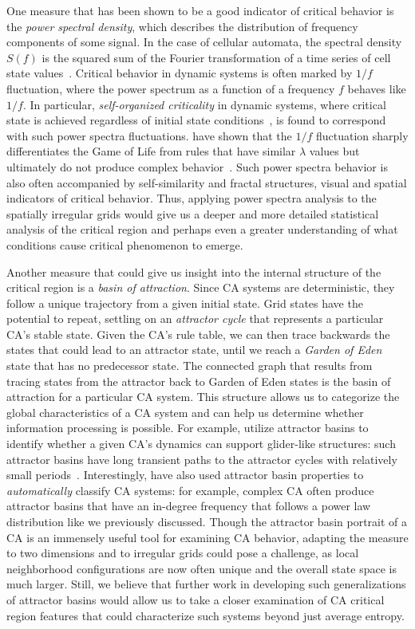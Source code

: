 \documentclass[a4paper,11pt,twoside]{report}
\begin{document}
One measure that has been shown to be a good indicator of critical behavior is the \textit{power spectral density}, which describes the distribution of frequency components of some signal. In the case of cellular automata, the spectral density $S(f)$ is the squared sum of the Fourier transformation of a time series of cell state values~\cite{ni98}. Critical behavior in dynamic systems is often marked by $1/f$ fluctuation, where the power spectrum as a function of a frequency $f$ behaves like $1/f$. In particular, \textit{self-organized criticality} in dynamic systems, where critical state is achieved regardless of initial state conditions~\cite{ba88}, is found to correspond with such power spectra fluctuations. \citeauthor{ni98} have shown that the $1/f$ fluctuation sharply differentiates the Game of Life from rules that have similar $\lambda$ values but ultimately do not produce complex behavior~\cite{ni98}. Such power spectra behavior is also often accompanied by self-similarity and fractal structures, visual and spatial indicators of critical behavior. Thus, applying power spectra analysis to the spatially irregular grids would give us a deeper and more detailed statistical analysis of the critical region and perhaps even a greater understanding of what conditions cause critical phenomenon to emerge.

Another measure that could give us insight into the internal structure of the critical region is a \textit{basin of attraction}. Since CA systems are deterministic, they follow a unique trajectory from a given initial state. Grid states have the potential to repeat, settling on an \textit{attractor cycle} that represents a particular CA's stable state. Given the CA's rule table, we can then trace backwards the states that could lead to an attractor state, until we reach a \textit{Garden of Eden} state that has no predecessor state. The connected graph that results from tracing states from the attractor back to Garden of Eden states is the basin of attraction for a particular CA system. This structure allows us to categorize the global characteristics of a CA system and can help us determine whether information processing is possible. For example, \citeauthor{wu98} utilize attractor basins to identify whether a given CA's dynamics can support glider-like structures: such attractor basins have long transient paths to the attractor cycles with relatively small periods~\cite{wu98}. Interestingly, \citeauthor{wu98} have also used attractor basin properties to \textit{automatically} classify CA systems: for example, complex CA often produce attractor basins that have an in-degree frequency that follows a power law distribution like we previously discussed. Though the attractor basin portrait of a CA is an immensely useful tool for examining CA behavior, adapting the measure to two dimensions and to irregular grids could pose a challenge, as local neighborhood configurations are now often unique and the overall state space is much larger. Still, we believe that further work in developing such generalizations of attractor basins would allow us to take a closer examination of CA critical region features that could characterize such systems beyond just average entropy.
\end{document}
